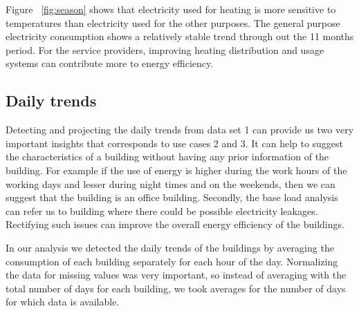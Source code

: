Figure ~\ref{fig:season} shows that electricity used for heating is more sensitive to temperatures than electricity  used for the other purposes. The general purpose electricity consumption shows a relatively stable trend through out the 11 months period. For the service providers, improving heating distribution and usage systems can contribute more to energy efficiency. 

\subsection{Daily trends}
Detecting and projecting the daily trends from data set 1 can provide us two very important insights that corresponds to use cases 2 and 3. It can help to suggest the characteristics of a building without having any prior information of the building. For example if the use of energy is higher during the work hours of the working days and lesser during night times and on the weekends, then we can suggest that the building is an office building. Secondly, the base load analysis can refer us to building where there could be possible electricity leakages. Rectifying such issues can improve the overall energy efficiency of the buildings.

In our analysis we detected the daily trends of the buildings by averaging the consumption of each building separately for each hour of the day. Normalizing the data for missing values was very important, so instead of averaging with the total number of days for each building, we took averages for the number of days for which data is available. 

